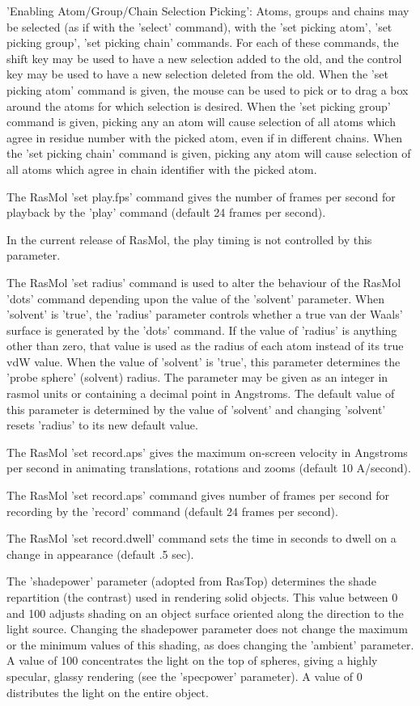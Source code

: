 'Enabling Atom/Group/Chain Selection Picking':
Atoms, groups and chains may be selected (as if with the
'select'
command), with the
'set picking atom',
'set picking group',
'set picking chain'
commands.  For each of these commands, the shift key may be used to
have a new selection added to the old, and the control key may be
used to have a new selection deleted from the old. When the
'set picking atom'
command is given, the mouse can be used to pick or to drag a box around
the atoms for which selection is desired.  When the
'set picking group'
command is given, picking any an atom will cause selection
of all atoms which agree in residue number with the picked atom,
even if in different chains.
When the
'set picking chain'
command is given, picking any atom will cause selection
of all atoms which agree in chain identifier with the picked atom.

The RasMol
'set play.fps'
command gives the number of frames per second for playback by the
'play'
command (default 24 frames per second).

In the current release of RasMol, the play timing is not controlled
by this parameter.

The RasMol
'set radius'
command is used to alter the behaviour of the RasMol
'dots'
command depending upon the value of the
'solvent'
parameter.
When
'solvent'
is
'true',
the
'radius'
parameter controls whether a true van der Waals' surface
is generated by the
'dots'
command. If the value of
'radius'
is anything other than zero, that value is used as the
radius of each atom instead of its true vdW value. When
the value of
'solvent'
is
'true',
this parameter determines the 'probe sphere' (solvent) radius.
The parameter may be given as an integer in rasmol units or
containing a decimal point in Angstroms. The default value of
this parameter is determined by the value of
'solvent'
and changing
'solvent'
resets
'radius'
to its new default value.

The RasMol
'set record.aps'
gives the maximum on-screen velocity in Angstroms per second in animating
translations, rotations and zooms (default 10 A/second).

The RasMol
'set record.aps'
command gives number of frames per second for recording by the
'record'
command (default 24 frames per second).

The RasMol
'set record.dwell'
command sets the time in seconds to dwell on a change in appearance
(default .5 sec).

The
'shadepower'
parameter (adopted from RasTop) determines the shade repartition (the contrast)
used in rendering solid objects. This value between 0 and 100 adjusts
shading on an object surface oriented along the direction to the
light source.  Changing the shadepower parameter does not change the
maximum or the minimum values of this shading, as does changing the
'ambient'
parameter.  A value of 100 concentrates the light on the top of spheres,
giving a highly specular, glassy rendering (see the
'specpower'
parameter).
A value of 0 distributes the light on the entire object.

